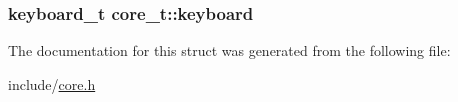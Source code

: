 \subsubsection[{\texorpdfstring{keyboard}{keyboard}}]{\setlength{\rightskip}{0pt plus 5cm}keyboard\+\_\+t core\+\_\+t\+::keyboard}\hypertarget{structcore__t_aaed73e0d01ec7b4f6ad9056810b24652}{}\label{structcore__t_aaed73e0d01ec7b4f6ad9056810b24652}


The documentation for this struct was generated from the following file\+:\begin{DoxyCompactItemize}
\item 
include/\hyperlink{core_8h}{core.\+h}\end{DoxyCompactItemize}
